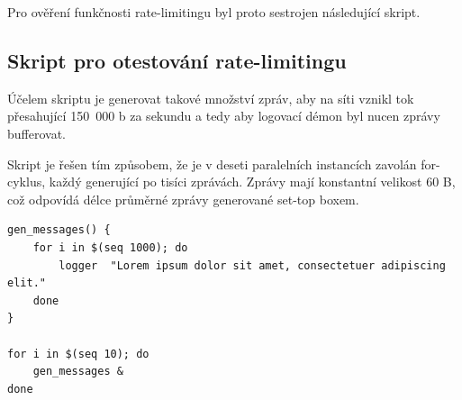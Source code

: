 \documentclass[thesis=B,czech]{FITthesis}[2012/06/26]
\begin{document}
Pro ověření funkčnosti rate-limitingu byl proto sestrojen následující skript.

\subsection{Skript pro otestování rate-limitingu}
Účelem skriptu je generovat takové množství zpráv, aby na síti vznikl tok přesahující 150~000 b za sekundu a tedy aby logovací démon byl nucen zprávy bufferovat.

Skript je řešen tím způsobem, že je v deseti paralelních instancích zavolán for-cyklus, každý generující po tisíci zprávách.
Zprávy mají konstantní velikost 60 B, což odpovídá délce průměrné zprávy generované set-top boxem.

\begin{lstlisting}[style=AshStyle]
gen_messages() {
	for i in $(seq 1000); do
		logger 	"Lorem ipsum dolor sit amet, consectetuer adipiscing elit."
	done
}

for i in $(seq 10); do
	gen_messages &
done
\end{lstlisting}
\end{document}
